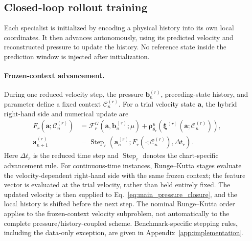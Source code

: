 \subsection{Closed-loop rollout training}
\label{sec:rollout_training}

Each specialist is initialized by encoding a physical history into
its own local coordinates. It then advances autonomously, using its
predicted velocity and reconstructed pressure to update the history.
No reference state inside the prediction window is injected after
initialization.

\paragraph{Frozen-context advancement.}
During one reduced velocity step, the pressure $\bm b_n^{(r)}$,
preceding-state history, and parameter define a fixed context
$\mathcal C_n^{(r)}$. For a trial velocity state $\bm a$, the hybrid
right-hand side and numerical update are
\begin{align}
  F_r(\bm a;\mathcal C_n^{(r)})
  &=\mathcal F_r^G(\bm a,\bm b_n^{(r)};\mu)
    +\bm\rho^u_{\theta_r}\!\left(
      \bm\xi^{(r)}(\bm a;\mathcal C_n^{(r)})\right),
    \label{eq:main_frozen_context_rhs}
    \\
  \bm a_{n+1}^{(r)}
  &=\operatorname{Step}_r\!\left(
     \bm a_n^{(r)};
     F_r(\cdot;\mathcal C_n^{(r)}),\Delta t_r\right).
    \label{eq:main_specialist_step}
\end{align}
Here $\Delta t_r$ is the reduced time step and
$\operatorname{Step}_r$ denotes the chart-specific advancement rule.
For continuous-time instances, Runge--Kutta stages evaluate the
velocity-dependent right-hand side with the same frozen context;
the feature vector is evaluated at the trial velocity, rather than
held entirely fixed. The updated velocity is then supplied to
Eq.~\eqref{eq:main_pressure_closure}, and the local history is shifted
before the next step. The nominal Runge--Kutta order applies to the
frozen-context velocity subproblem, not automatically to the complete
pressure/history-coupled scheme. Benchmark-specific stepping rules,
including the data-only exception, are given in
Appendix~\ref{app:implementation}.

